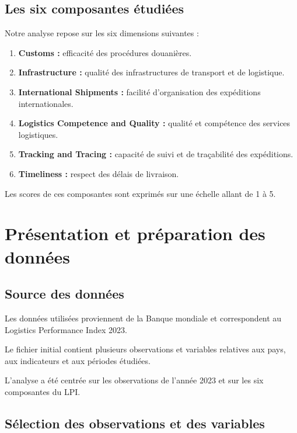 \documentclass[11pt,a4paper]{article}
\begin{document}
\subsection{Les six composantes étudiées}

Notre analyse repose sur les six dimensions suivantes :

\begin{enumerate}
    \item \textbf{Customs :} efficacité des procédures douanières.
    \item \textbf{Infrastructure :} qualité des infrastructures
    de transport et de logistique.
    \item \textbf{International Shipments :} facilité d'organisation
    des expéditions internationales.
    \item \textbf{Logistics Competence and Quality :} qualité et
    compétence des services logistiques.
    \item \textbf{Tracking and Tracing :} capacité de suivi et de
    traçabilité des expéditions.
    \item \textbf{Timeliness :} respect des délais de livraison.
\end{enumerate}

Les scores de ces composantes sont exprimés sur une échelle
allant de 1 à 5.


\section{Présentation et préparation des données}

\subsection{Source des données}

Les données utilisées proviennent de la Banque mondiale et
correspondent au Logistics Performance Index 2023.

Le fichier initial contient plusieurs observations et variables
relatives aux pays, aux indicateurs et aux périodes étudiées.

L'analyse a été centrée sur les observations de l'année 2023
et sur les six composantes du LPI.

\subsection{Sélection des observations et des variables}
\end{document}
